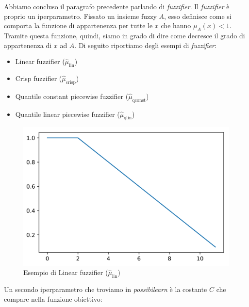 \documentclass[12pt,italian]{report}
\begin{document}
Abbiamo concluso il paragrafo precedente parlando di \emph{fuzzifier}. Il \emph{fuzzifier} è proprio un iperparametro. Fissato un insieme fuzzy $A$, esso definisce come si comporta la funzione di appartenenza per tutte le $x$ che hanno $ \mu_{A}(x) < 1 $. Tramite questa funzione, quindi, siamo in grado di dire come decresce il grado di appartenenza di $x$ ad $A$. Di seguito riportiamo degli esempi di \emph{fuzzifier}:

\begin{itemize}
	\item Linear fuzzifier ($\hat\mu_{\text{lin}}$)
	\item Crisp fuzzifier ($\hat\mu_{\text{crisp}}$)
	\item Quantile constant piecewise fuzzifier ($\hat\mu_{\text{qconst}}$)
	\item Quantile linear piecewise fuzzifier ($\hat \mu_{\text{qlin}}$)
\end{itemize}

\begin{figure}[h!]
	\center
	\includegraphics[scale=0.1]{../img/lin}
	\caption{Esempio di Linear fuzzifier ($\hat\mu_{\text{lin}}$)}
	\label{fig:fuzzifier}
\end{figure}

Un secondo iperparametro che troviamo in \emph{possibilearn} è la costante $C$ che compare nella funzione obiettivo:
\end{document}
